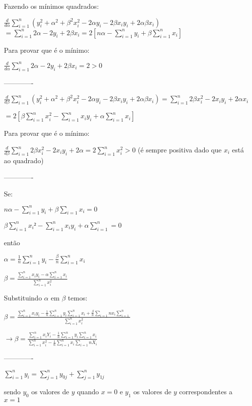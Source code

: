 \documentclass[11pt,]{article}
\begin{document}
Fazendo os mínimos quadrados:

\(\frac{d}{d\alpha} \sum_{i=1}^n ( y_{i}^2 + \alpha^2 + \beta^2 x_{i}^2 - 2 \alpha y_{i} - 2 \beta x_{i} y_{i} + 2 \alpha \beta x_{i})\)
\(= \sum_{i=1}^n 2 \alpha - 2 y_{i} + 2 \beta x_{i} = 2 [n \alpha - \sum_{i=1}^n y_{i} + \beta \sum_{i=1}^n x_{i}]\)

Para provar que é o mínimo:

\(\frac{d}{d \alpha} \sum_{i=1}^n 2 \alpha - 2 y_{i} + 2 \beta x_{i} = 2 > 0\)

-------------

\(\frac{d}{d \beta} \sum_{i=1}^n ( y_{i}^2 + \alpha^2 + \beta^2 x_{i}^2 - 2 \alpha y_{i} - 2 \beta x_{i} y_{i} + 2 \alpha \beta x_{i}) = \sum_{i=1}^n 2 \beta x_{i}^2 - 2 x_{i} y_{i} +2 \alpha x_{i}\)

\(= 2 [\beta \sum_{i=1}^n x_{i}^2 - \sum_{i=1}^n x_{i} y_ {i} + \alpha \sum_{i=1}^n x_{i}]\)

Para provar que é o mínimo:

\(\frac{d}{d \beta} \sum_{i=1}^n 2 \beta x_{i}^2 - 2 x_{i} y_{i} +2 \alpha= 2 \sum_{i=1}^n x_{i}^2 >0\)
(é sempre positiva dado que \(x_{i}\) está ao quadrado)

-------------

Se:

\(n \alpha - \sum_{i=1}^n y_{i} + \beta \sum_{i=1} x_{i} = 0\)

\(\beta \sum_{i=1}^n x_{i}² - \sum_{i=1}^n x_{i} y_{i} + \alpha \sum_{i=1}^n = 0\)

então

\(\alpha = \frac{1}{n} \sum_{i=1}^n y_{i} - \frac{ \beta}{n} \sum_{i=1}^n x_{i}\)

\(\beta = \frac{ \sum_{i=1}^n x_{i} y_{i} - \alpha \sum_{i=1}^n x_{i}}{\sum_{i=1}^n x_{i}^2}\)

Substituindo \(\alpha\) em \(\beta\) temos:

\(\beta = \frac{ \sum_{i=1}^n x_{i} y_{i} - \frac{1}{n} \sum_{i=1}^n y_{i} \sum_{i=1}^n x_{i} + \frac{\beta}{n} \sum_{i=1}{n}x_{i} \sum_{i=1}^n} {\sum_{i=1}^n x_{i}^2}\)

\(\rightarrow \beta = \frac{\sum_{i=1}^n x_{i} Y_{i} - \frac{1}{n} \sum_{i=1}^n y_{i} \sum_{i=1}^n x_{i}}{\sum_{i=1}^n x_{i}^2 - \frac{1}{n} \sum_{i=1}^n x_{i} \sum_{i=1}{n} X_{i}}\)

-------------

\(\sum_{i=1}^n y_{i}= \sum_{j=1}^n y_{0j} + \sum_{j=1}^n y_{1j}\)

sendo \(y_{0}\) os valores de \(y\) quando \(x=0\) e \(y_{1}\) os
valores de \(y\) correspondentes a \(x=1\)
\end{document}
